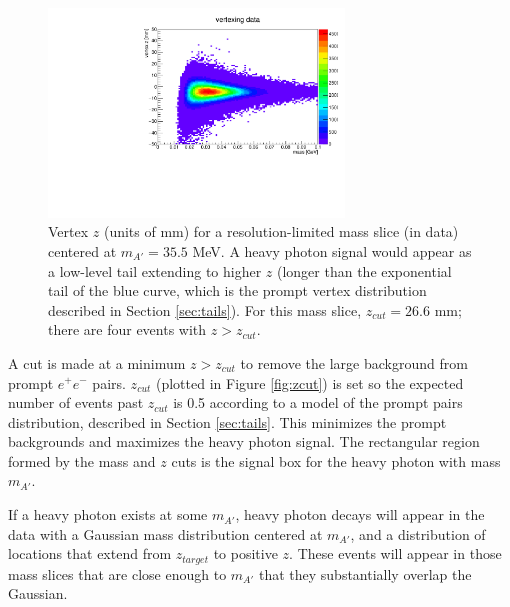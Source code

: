 \begin{figure}[ht]
\begin{center}
    \includegraphics[width=0.7\textwidth,page=61,angle=-90]{vertexing/figs/golden_mres}
\end{center}
\caption{Vertex $z$ (units of mm) for a resolution-limited mass slice (in data) centered at $m_{A'}=35.5$ MeV. A heavy photon signal would appear as a low-level tail extending to higher $z$ (longer than the exponential tail of the blue curve, which is the prompt vertex distribution described in Section \ref{sec:tails}).
    For this mass slice, $z_{cut}=26.6$ mm; there are four events with $z>z_{cut}$.}
    \label{fig:vz_1d}
\end{figure}

A cut is made at a minimum $z>z_{cut}$ to remove the large background from prompt $e^+e^-$ pairs.
$z_{cut}$ (plotted in Figure \ref{fig:zcut}) is set so the expected number of events past $z_{cut}$ is 0.5 according to a model of the prompt pairs distribution, described in Section \ref{sec:tails}.
This minimizes the prompt backgrounds and maximizes the heavy photon signal.
The rectangular region formed by the mass and $z$ cuts is the signal box for the heavy photon with mass $m_{A'}$.

If a heavy photon exists at some $m_{A'}$, heavy photon decays will appear in the data with a Gaussian mass distribution centered at $m_{A'}$, and a distribution of locations that extend from $z_{target}$ to positive $z$.
These events will appear in those mass slices that are close enough to $m_{A'}$ that they substantially overlap the Gaussian.


